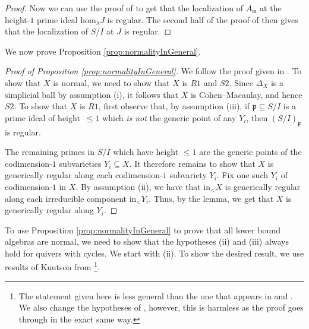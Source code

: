 \documentclass[10pt]{amsart}
\numberwithin{equation}{section}
\theoremstyle{definition}
\theoremstyle{remark}
\newcommand{\1}{^{-1}}
\begin{document}
\begin{proof}
Now we can use the proof of \cite[Lemma 3.2]{BC03} to get that the localization of $A_{\mathfrak{m}}$ at the height-$1$ prime ideal $\textrm{hom}_\lambda J$ is regular. The second half of the proof of \cite[Proposition 3.1 (b)]{BC03} then gives that the localization of $S/I$ at $J$ is regular.
\end{proof}

We now prove Proposition \ref{prop:normalityInGeneral}.

\begin{proof}[Proof of Proposition \ref{prop:normalityInGeneral}]
We follow the proof given in \cite[Proposition 8.1]{KLS-Richardson}. 
To show that $X$ is normal, we need to show that $X$ is $R1$ and $S2$. Since $\Delta_X$ is a simplicial ball by assumption (i), it follows that $X$ is Cohen--Macaulay, and hence $S2$.
To show that $X$ is $R1$, first observe that, by assumption (iii), if $\mathfrak{p}\subseteq S/I$ is a prime ideal of height~$\leq 1$ which \emph{is not} the generic point of any $Y_i$, then $(S/I)_{\mathfrak{p}}$ is regular. 

The remaining primes in $S/I$ which have height $\leq 1$ are the generic points of the codimension-$1$ subvarieties $Y_i\subseteq X$.
It therefore remains to show that $X$ is generically regular along each codimension-$1$ subvariety $Y_i$. Fix one such $Y_i$ of codimension-$1$ in $X$.
By assumption (ii), we have that $\textrm{in}_< X$ is generically regular along each irreducible component $\textrm{in}_< Y_i$. Thus, by the lemma, we get that $X$ is generically regular along $Y_i$.
\end{proof}

To use Proposition \ref{prop:normalityInGeneral} to prove that all lower bound algebras are normal, we need to show that the hypotheses (ii) and (iii) always hold for quivers with cycles. We start with (ii). To show the desired result, we use results of Knutson from \cite{Knu09}\footnote{The statement given here is less general than the one that appears in \cite[Theorem 2]{Knu09} and \cite[Lemma 6]{Knu09}. We also change the hypotheses of \cite[Theorem 2]{Knu09}, however, this is harmless as the proof goes through in the exact same way.}. 
\end{document}
